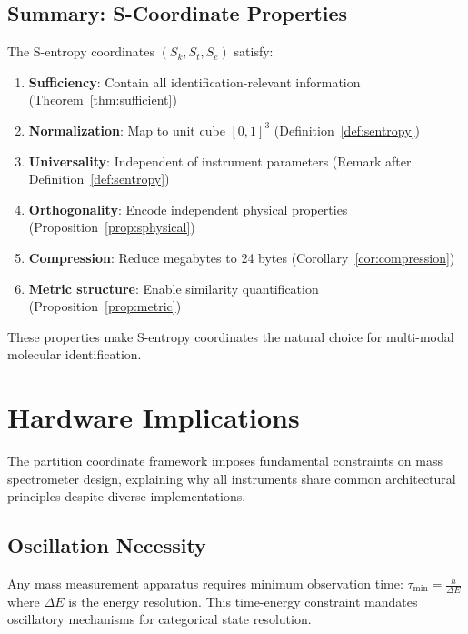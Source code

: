 \subsection{Summary: S-Coordinate Properties}

The S-entropy coordinates $(S_k, S_t, S_e)$ satisfy:
\begin{enumerate}
    \item \textbf{Sufficiency}: Contain all identification-relevant information (Theorem~\ref{thm:sufficient})
    \item \textbf{Normalization}: Map to unit cube $[0,1]^3$ (Definition~\ref{def:sentropy})
    \item \textbf{Universality}: Independent of instrument parameters (Remark after Definition~\ref{def:sentropy})
    \item \textbf{Orthogonality}: Encode independent physical properties (Proposition~\ref{prop:sphysical})
    \item \textbf{Compression}: Reduce megabytes to 24 bytes (Corollary~\ref{cor:compression})
    \item \textbf{Metric structure}: Enable similarity quantification (Proposition~\ref{prop:metric})
\end{enumerate}

These properties make S-entropy coordinates the natural choice for multi-modal molecular identification.

\section{Hardware Implications}
\label{sec:hardware}

The partition coordinate framework imposes fundamental constraints on mass spectrometer design, explaining why all instruments share common architectural principles despite diverse implementations.

\subsection{Oscillation Necessity}

\begin{theorem}
\label{thm:hardware}
Any mass measurement apparatus requires minimum observation time:
$
\tau_{\min} = \frac{h}{\Delta E}
$
where $\Delta E$ is the energy resolution. This time-energy constraint mandates oscillatory mechanisms for categorical state resolution.
\end{theorem}

